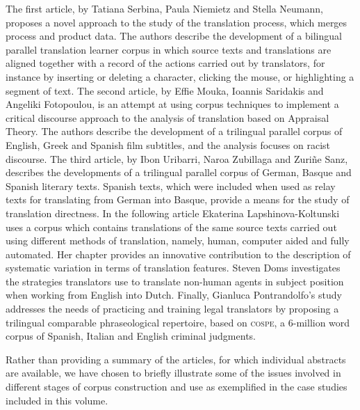 \documentclass[output=paper]{LSP/langsci}
\begin{document}
The first article, by Tatiana Serbina, Paula Niemietz and Stella Neumann, proposes a novel approach to the study of the translation process, which merges process and product data. The authors describe the development of a bilingual parallel translation learner corpus in which source texts and translations are aligned together with a record of the actions carried out by translators, for instance by inserting or deleting a character, clicking the mouse, or highlighting a segment of text. The second article, by Effie Mouka, Ioannis Saridakis and Angeliki Fotopoulou, is an attempt at using corpus techniques to implement a critical discourse approach to the analysis of translation based on Appraisal Theory. The authors describe the development of a trilingual parallel corpus of English, Greek and Spanish film subtitles, and the analysis focuses on racist discourse. The third article, by Ibon Uribarri, Naroa Zubillaga and Zuriñe Sanz, describes the developments of a trilingual parallel corpus of German, Basque and Spanish literary texts. Spanish texts, which were included when used as relay texts for translating from German into Basque, provide a means for the study of translation directness. In the following article Ekaterina Lapshinova-Koltunski uses a corpus which contains translations of the same source texts carried out using different methods of translation, namely, human, computer aided and fully automated. Her chapter provides an innovative contribution to the description of systematic variation in terms of translation features. Steven Doms investigates the strategies translators use to translate non-human agents in subject position when working from English into Dutch. Finally, Gianluca Pontrandolfo’s study addresses the needs of practicing and training legal translators by proposing a trilingual comparable phraseological repertoire, based on \textsc{cospe}, a 6-million word corpus of Spanish, Italian and English criminal judgments.

Rather than providing a summary of the articles, for which individual abstracts are available, we have chosen to briefly illustrate some of the issues involved in different stages of corpus construction and use as exemplified in the case studies included in this volume.
\end{document}
